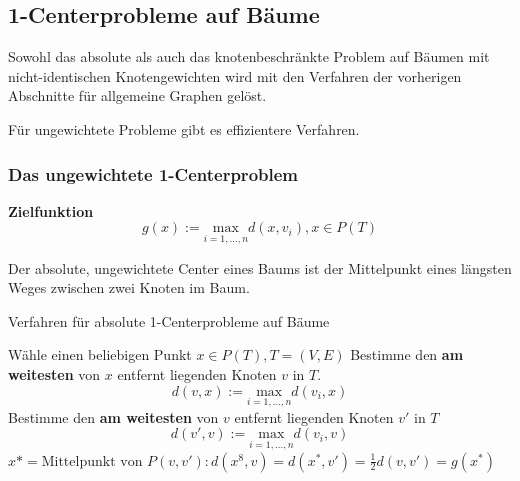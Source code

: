     \subsection{1-Centerprobleme auf Bäume} %
    \label{sub:1_centerprobleme_auf_b_ume}
      
      \par Sowohl das absolute als auch das knotenbeschränkte Problem auf Bäumen mit nicht-identischen Knotengewichten wird mit den Verfahren der vorherigen Abschnitte für allgemeine Graphen gelöst.
      
      \par Für ungewichtete Probleme gibt es effizientere Verfahren.

      \subsubsection{Das ungewichtete 1-Centerproblem} %
      \label{ssub:das_ungewichtete_1_centerproblem}

      \par \textbf{Zielfunktion}
      \[
        g(x) := \underset{i=1,\dots, n}{\text{max}}d(x, v_i), x \in P(T)
      \]

      Der absolute, ungewichtete Center eines Baums ist der Mittelpunkt eines längsten Weges zwischen zwei Knoten im Baum.

      \begin{algorithm}[H]
        \begin{algorithmic}[1]
          \caption{Verfahren für absolute 1-Centerprobleme auf Bäume}
          \State Wähle einen beliebigen Punkt $x \in P(T), T = (V, E)$
          \State Bestimme den \textbf{am weitesten} von $x$ entfernt liegenden Knoten $v$ in $T$.
          \[d(v,x):= \underset{i=1, \dots, n}{\text{max}}d(v_i, x)\]
          \State Bestimme den \textbf{am weitesten} von $v$ entfernt liegenden Knoten $v'$ in $T$
          \[d(v', v) := \underset{i = 1, \dots, n}{\text{max}}d(v_i, v)\]
          \State $x* = \text{Mittelpunkt von } P(v, v'): d(x^8, v) = d(x^*, v') = \frac{1}{2}d(v, v') = g(x^*)$
        \end{algorithmic}
      \end{algorithm}

      \begin{exmp}
        
      \end{exmp}

